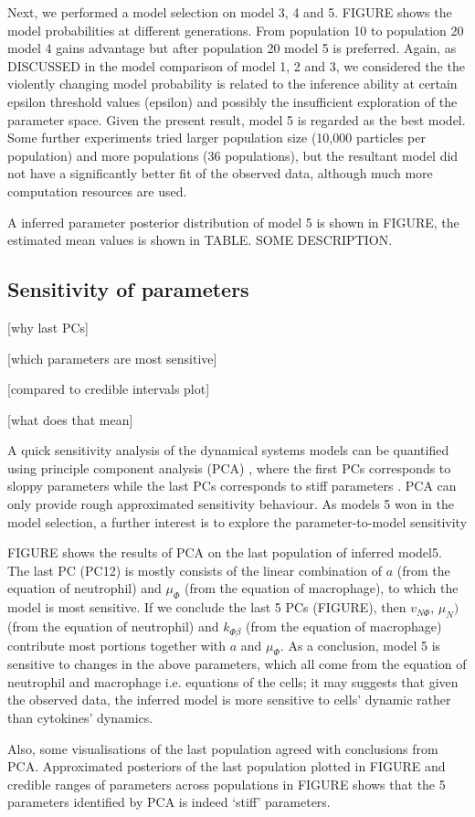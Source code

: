 Next, we performed a model selection on model 3, 4 and 5. FIGURE shows the model probabilities at different generations. From population 10 to population 20 model 4 gains advantage but after population 20 model 5 is preferred. Again, as DISCUSSED in the model comparison of model 1, 2 and 3, we considered the the violently changing model probability is related to the inference ability at certain epsilon threshold values (epsilon) and possibly the insufficient exploration of the parameter space. Given the present result, model 5 is regarded as the best model. Some further experiments tried larger population size (10,000 particles per population) and more populations (36 populations), but the resultant model did not have a significantly better fit of the observed data, although much more computation resources are used.

A inferred parameter posterior distribution of model 5 is shown in FIGURE, the estimated mean values is shown in TABLE. SOME DESCRIPTION.


\subsection{Sensitivity of parameters}

[why last PCs]

[which parameters are most sensitive]

[compared to credible intervals plot]

[what does that mean]

A quick sensitivity analysis of the dynamical systems models can be quantified using principle component analysis (PCA) \cite{Toni}, where the first PCs corresponds to sloppy parameters while the last PCs corresponds to stiff parameters \cite{sensitivity}. PCA can only provide rough approximated sensitivity behaviour. As models 5 won in the model selection, a further interest is to explore the parameter-to-model sensitivity

FIGURE shows the results of PCA on the last population of inferred model5. The last PC (PC12) is mostly consists of the linear combination of $a$ (from the equation of neutrophil) and $\mu_\Phi$ (from the equation of macrophage), to which the model is most sensitive. If we conclude the last 5 PCs (FIGURE), then $v_{N\Phi}$, $\mu_N)$ (from the equation of neutrophil) and $k_{\Phi\beta}$ (from the equation of macrophage) contribute most portions together with $a$ and $\mu_\Phi$. As a conclusion, model 5 is sensitive to changes in the above parameters, which all come from the equation of neutrophil and macrophage i.e. equations of the cells; it may suggests that given the observed data, the inferred model is more sensitive to cells' dynamic rather than cytokines' dynamics.

Also, some visualisations of the last population agreed with conclusions from PCA. Approximated posteriors of the last population plotted in FIGURE and credible ranges of parameters across populations in FIGURE shows that the 5 parameters identified by PCA is indeed `stiff' parameters.
